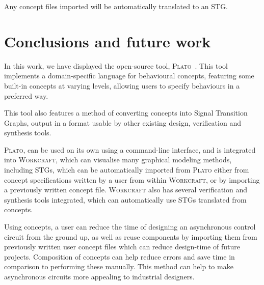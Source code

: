 \documentclass[british,conference,compsoc]{IEEEtran}
\newcommand{\noun}[1]{\textsc{#1}}
\begin{document}
Any concept files imported will be automatically translated to an STG.

\vspace{-3mm}

%
%
%

\section{Conclusions and future work\label{sec:conclusions}}

\vspace{-3mm}

In this work, we have displayed the open-source
tool, \noun{Plato}~\cite{2016_concepts_github}. This tool implements a 
domain-specific language for behavioural concepts, featuring some built-in 
concepts at varying levels, allowing users to specify behaviours in a preferred 
way. 

This tool also features a method of converting concepts into Signal
Transition Graphs, output in a format usable by other existing design, 
verification and synthesis tools. 

\noun{Plato}, can be used on its own using a command-line interface, and is
integrated into \noun{Workcraft}, which can visualise many graphical modeling
methods, including STGs, which can be automatically imported from \noun{Plato}
either from concept specifications written by a user from within 
\noun{Workcraft}, or by importing a previously written concept file.
\noun{Workcraft} also has several verification and synthesis tools 
integrated, which can automatically use STGs translated from concepts. 

Using concepts, a user can reduce the time of designing an asynchronous
control circuit from the ground up, as well as reuse components
by importing them from previously written user concept files which can reduce 
design-time of future projects. Composition of concepts can help
reduce errors and save time in comparison to performing these manually.
This method can help to make asynchronous circuits more appealing
to industrial designers.
\end{document}
